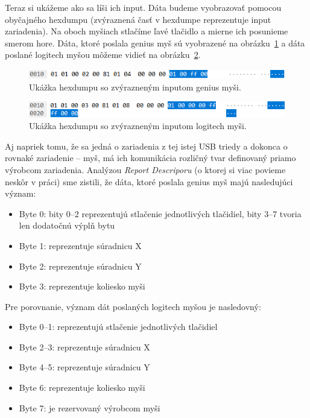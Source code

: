Teraz si ukážeme ako sa líši ich input. Dáta budeme vyobrazovať pomocou obyčajného hexdumpu (zvýraznená časť v hexdumpe reprezentuje input zariadenia). Na oboch myšiach stlačíme ľavé tlačidlo a mierne ich posunieme smerom hore. Dáta, ktoré poslala genius myš sú vyobrazené na obrázku~\ref{obr:uvod:genius:input} a dáta poslané logitech myšou môžeme vidieť na obrázku~\ref{obr:uvod:logitech:input}.

\begin{figure}[!htb]
	\centering
	\includegraphics[width=12cm]{img/uvod_genius_input}
	\caption{Ukážka hexdumpu so zvýrazneným inputom genius myši.}
	\label{obr:uvod:genius:input}
\end{figure}

\begin{figure}[!htb]
	\centering
	\includegraphics[width=12cm]{img/uvod_logitech_input}
	\caption{Ukážka hexdumpu so zvýrazneným inputom logitech myši.}
	\label{obr:uvod:logitech:input}
\end{figure}

Aj napriek tomu, že sa jedná o zariadenia z tej istej USB triedy a dokonca o rovnaké zariadenie -- myš,  má ich komunikácia rozličný tvar definovaný priamo výrobcom zariadenia. Analýzou \textit{Report Descriporu} (o ktorej si viac povieme neskôr v práci) sme zistili, že dáta, ktoré poslala genius myš majú nasledujúci význam:
\begin{itemize}
\item Byte 0: bity 0--2 reprezentujú stlačenie jednotlivých tlačidiel, bity 3--7 tvoria len dodatočnú výplň bytu
\item Byte 1: reprezentuje súradnicu X
\item Byte 2: reprezentuje súradnicu Y
\item Byte 3: reprezentuje koliesko myši
\end{itemize}

Pre porovnanie, význam dát poslaných logitech myšou je nasledovný:
\begin{itemize}
\item Byte 0--1: reprezentujú stlačenie jednotlivých tlačidiel
\item Byte 2--3: reprezentuje súradnicu X
\item Byte 4--5: reprezentuje súradnicu Y
\item Byte 6: reprezentuje koliesko myši
\item Byte 7: je rezervovaný výrobcom myši
\end{itemize}

